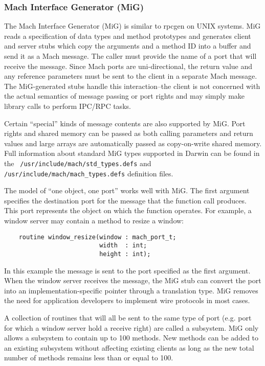 \subsubsection{Mach Interface Generator (MiG)}

The Mach Interface Generator (MiG) is similar to rpcgen on UNIX
systems. MiG reads a specification of data types and method prototypes
and generates client and server stubs which copy the arguments and a
method ID into a buffer and send it as a Mach message.  The caller
must provide the name of a port that will receive the message.  Since
Mach ports are uni-directional, the return value and any reference
parameters must be sent to the client in a separate Mach message. The
MiG-generated stubs handle this interaction--the client is not
concerned with the actual semantics of message passing or port rights
and may simply make library calls to perform IPC/RPC tasks.

Certain ``special'' kinds of message contents are also supported by
MiG. Port rights and shared memory can be passed as both calling
parameters and return values and large arrays are automatically
passed as copy-on-write shared memory. Full information about
standard MiG types supported in Darwin can be found in the {\tt
/usr/include/mach/std\_types.defs} and {\tt
/usr/include/mach/mach\_types.defs} definition files.

The model of ``one object, one port'' works well with MiG. The
first argument specifies the destination port for the message that
the function call produces. This port represents the object on which
the function operates.  For example, a window server may contain a
method to resize a window:

\begin{verbatim}
    routine window_resize(window : mach_port_t;
                          width  : int;
                          height : int);
\end{verbatim}

In this example the message is sent to the port specified as the
first argument.  When the window server receives the message, the
MiG stub can convert the port into an implementation-specific pointer
through a translation type. MiG removes the need for application
developers to implement wire protocols in most cases.

A collection of routines that will all be sent to the same type of
port (e.g. port for which a window server hold a receive right) are
called a subsystem. MiG only allows a subsystem to contain up to
100 methods. New methods can be added to an existing subsystem
without affecting existing clients as long as the new total number
of methods remains less than or equal to 100.

